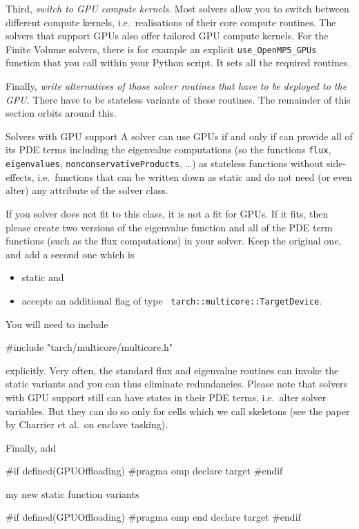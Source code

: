 Third, \emph{switch to GPU compute kernels}.
Most solvers allow you to switch between different compute kernels,
i.e.~realisations of their core compute routines.
The solvers that support GPUs also offer tailored GPU compute kernels.
For the Finite Volume solvers, there is for example an explicit
\texttt{use\_OpenMP5\_GPUs} function that you call within your Python
script.
It sets all the required routines.



Finally, \emph{write alternatives of those solver routines that have to be
deployed to the GPU}.
There have to be stateless variants of these routines.
The remainder of this section orbits around this.


\begin{definition}{Solvers with GPU support}
 A solver can use GPUs if and only if can provide all of its PDE terms
 including the eigenvalue computations (so the functions \texttt{flux},
 \texttt{eigenvalues}, \texttt{nonconservativeProducts}, \ldots) as stateless
 functions without side-effects, i.e.~functions that can be written down as
 static and do not need (or even alter) any attribute of the solver class.
\end{definition}

\noindent
If you solver does not fit to this class, it is not a fit for GPUs.
If it fits, then please create two versions of the eigenvalue function and all
of the PDE term functions (such as the flux computations) in your solver.
Keep the original one, and add a second one which is 

\begin{itemize}
  \item static and 
  \item accepts an additional flag of type \texttt{
  tarch::multicore::TargetDevice}.
\end{itemize}

\noindent
You will need to include 
\begin{code}
#include "tarch/multicore/multicore.h"
\end{code} 

\noindent
explicitly. Very often, the standard flux and eigenvalue routines can invoke the
static variants and you can thus eliminate redundancies.
Please note that solvers with GPU support still can have states in their PDE
terms, i.e.~alter solver variables.
But they can do so only for cells which we call skeletons (see the paper by
Charrier et al.~on enclave tasking).


Finally, add
\begin{code}
#if defined(GPUOffloading)
#pragma omp declare target
#endif

my new static function variants

#if defined(GPUOffloading)
#pragma omp end declare target
#endif
\end{code} 






